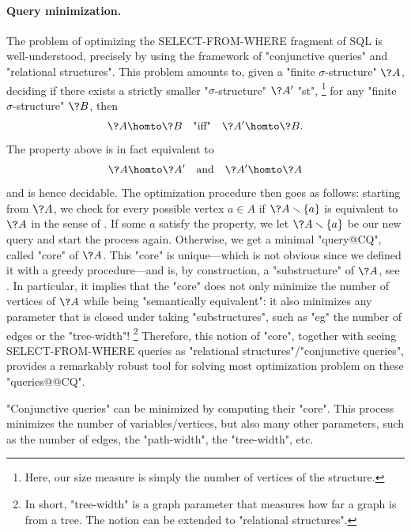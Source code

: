\paragraph*{Query minimization.}
The problem of optimizing the \textsf{SELECT-FROM-WHERE} fragment of
SQL is well-understood, precisely by using the framework of "conjunctive queries"
and "relational structures".
This problem amounts to, given a "finite $\sigma$-structure" $\?A$,
deciding if there exists a strictly smaller "$\sigma$-structure" $\?A'$ "st",%
\footnote{Here, our size measure is simply the number of vertices of the structure.}
for any "finite $\sigma$-structure" $\?B$, then
\[
	\?A \homto \?B
	\quad\text{"iff"}\quad
	\?A' \homto \?B.
\]
The property above is in fact equivalent to
\begin{equation}
	\?A \homto \?A'
	\quad\text{and}\quad
	\?A' \homto \?A
	\label{eq:intro-hom-equivalence}
\end{equation}
and is hence decidable.
The optimization procedure then goes as follows:
starting from $\?A$, we check for every possible vertex $a \in A$
if $\?A \smallsetminus \{a\}$ is equivalent to $\?A$ in the sense of
. If some $a$ satisfy the property, we
let $\?A \smallsetminus \{a\}$ be our new query and start the process again.
Otherwise, we get a minimal "query@CQ", called "core" of $\?A$.
This "core" is unique---which is not obvious since we defined it with
a greedy procedure---and is, by construction, a "substructure" of $\?A$,
see .
In particular, it implies that the "core" does not only minimize the number of
vertices of $\?A$ while being "semantically equivalent": it also minimizes any
parameter that is closed under taking "substructures", such as "eg"
the number of edges or the "tree-width"!%
\footnote{In short, "tree-width" is a graph parameter that measures how far a graph is from a tree.
The notion can be extended to "relational structures".}
Therefore, this notion of "core", together with seeing
\textsf{SELECT-FROM-WHERE} queries as "relational structures"/"conjunctive queries",
provides a remarkably robust tool for solving most optimization problem on these "queries@@CQ".

\begin{known}
	"Conjunctive queries" can be minimized by computing their "core".
	This process minimizes the number of variables/vertices, but also many other
	parameters, such as the number of edges, the "path-width", the "tree-width", etc.
\end{known}

